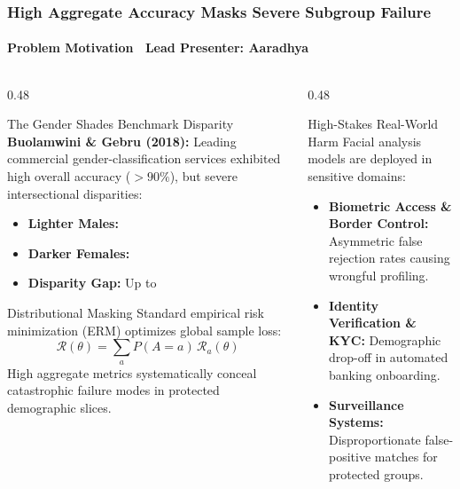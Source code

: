 \begin{frame}
  \frametitle{High Aggregate Accuracy Masks Severe Subgroup Failure}
  \framesubtitle{Problem Motivation \textbar\ Lead Presenter: Aaradhya}

  \begin{columns}[T]
    \begin{column}{0.48\textwidth}
      \begin{alertcard}{The Gender Shades Benchmark Disparity}
        \scriptsize
        \textbf{Buolamwini \& Gebru (2018):} Leading commercial gender-classification services exhibited high overall accuracy ($>90\%$), but severe intersectional disparities:
        \vspace{0.05cm}
        \begin{itemize}\scriptsize
          \item \textbf{Lighter Males:} 
          \item \textbf{Darker Females:} 
          \item \textbf{Disparity Gap:} Up to 
        \end{itemize}
      \end{alertcard}
      
      \vspace{0.1cm}
      \begin{card}{Distributional Masking}
        \scriptsize
        Standard empirical risk minimization (ERM) optimizes global sample loss:
        $$\mathcal{R}(\theta) = \sum_a P(A=a)\,\mathcal{R}_a(\theta)$$
        High aggregate metrics systematically conceal catastrophic failure modes in protected demographic slices.
      \end{card}
    \end{column}

    \begin{column}{0.48\textwidth}
      \begin{statcard}{High-Stakes Real-World Harm}
        \scriptsize
        Facial analysis models are deployed in sensitive domains:
        \begin{itemize}\scriptsize
          \item \textbf{Biometric Access \& Border Control:} Asymmetric false rejection rates causing wrongful profiling.
          \item \textbf{Identity Verification \& KYC:} Demographic drop-off in automated banking onboarding.
          \item \textbf{Surveillance Systems:} Disproportionate false-positive matches for protected groups.
        \end{itemize}
      \end{statcard}


\end{column}
\end{columns}
\end{frame}

